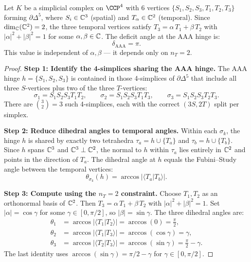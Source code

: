 \begin{lemma}
\label{lem:delta}
Let $K$ be a simplicial complex on $\CCP^4$ with 6 vertices
$\{S_1, S_2, S_3, T_1, T_2, T_3\}$ forming $\partial\Delta^5$, where
$S_i \in \mathbb{C}^3$ (spatial) and $T_\alpha \in \mathbb{C}^2$ (temporal).
Since $\dim_{\mathbb{C}}(\mathbb{C}^2) = 2$, the three temporal vertices
satisfy $T_3 = \alpha\, T_1 + \beta\, T_2$ with
$|\alpha|^2 + |\beta|^2 = 1$ for some $\alpha, \beta \in \mathbb{C}$.
The deficit angle at the AAA hinge is:
\begin{equation}
\boxed{\delta_{\mathrm{AAA}} = \pi.}
\end{equation}
This value is independent of $\alpha, \beta$ --- it depends only on $n_T = 2$.
\end{lemma}

\begin{proof}
\textbf{Step 1: Identify the 4-simplices sharing the AAA hinge.}
The AAA hinge $h = \{S_1, S_2, S_3\}$ is contained in those 4-simplices
of $\partial\Delta^5$ that include all three $S$-vertices plus two of
the three $T$-vertices:
\begin{equation}
\sigma_1 = S_1 S_2 S_3 T_1 T_2, \qquad
\sigma_2 = S_1 S_2 S_3 T_1 T_3, \qquad
\sigma_3 = S_1 S_2 S_3 T_2 T_3.
\end{equation}
There are $\binom{3}{2} = 3$ such 4-simplices, each with the correct
$(3S, 2T)$ split per simplex.

\medskip\noindent
\textbf{Step 2: Reduce dihedral angles to temporal angles.}
Within each $\sigma_k$, the hinge $h$ is shared by exactly two
tetrahedra $\tau_a = h \cup \{T_a\}$ and $\tau_b = h \cup \{T_b\}$.
Since $h$ spans $\mathbb{C}^3$ and $\mathbb{C}^3 \perp \mathbb{C}^2$,
the normal to $h$ within $\tau_a$ lies entirely in $\mathbb{C}^2$
and points in the direction of $T_a$.  The dihedral angle at $h$
equals the Fubini--Study angle between the temporal vertices:
\begin{equation}
\theta_{\sigma_k}(h) = \arccos\bigl|\langle T_a | T_b \rangle\bigr|.
\end{equation}

\medskip\noindent
\textbf{Step 3: Compute using the $n_T = 2$ constraint.}
Choose $T_1, T_2$ as an orthonormal basis of $\mathbb{C}^2$.
Then $T_3 = \alpha\, T_1 + \beta\, T_2$ with
$|\alpha|^2 + |\beta|^2 = 1$.
Set $|\alpha| = \cos\gamma$ for some $\gamma \in [0, \pi/2]$,
so $|\beta| = \sin\gamma$. The three dihedral angles are:
\begin{align}
\theta_1 &= \arccos|\langle T_1 | T_2 \rangle|
         = \arccos(0) = \frac{\pi}{2}, \\
\theta_2 &= \arccos|\langle T_1 | T_3 \rangle|
         = \arccos(\cos\gamma) = \gamma, \\
\theta_3 &= \arccos|\langle T_2 | T_3 \rangle|
         = \arccos(\sin\gamma) = \frac{\pi}{2} - \gamma.
\end{align}
The last identity uses $\arccos(\sin\gamma) = \pi/2 - \gamma$
for $\gamma \in [0, \pi/2]$.


\end{proof}
